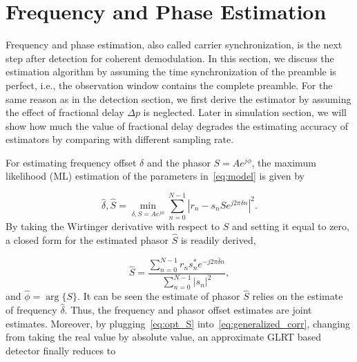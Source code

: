 \section{Frequency and Phase Estimation}%
\label{sec:freq_est}

Frequency and phase estimation, also called carrier synchronization, is the next step after detection for coherent demodulation.
In this section, we discuss the estimation algorithm by assuming the time synchronization of the preamble is perfect, i.e., 
the observation window contains the complete preamble. For the same reason as in the detection section, we first derive the estimator
by assuming the effect of fractional delay $\Delta p$ is neglected.
Later in simulation section, we will show how much the value of fractional delay degrades the estimating accuracy of estimators by
comparing with different sampling rate.

For estimating frequency offset $\delta$ and the phasor $S=Ae^{j\phi}$, the maximum likelihood (ML) estimation of the parameters in~\eqref{eq:model} is given by

\begin{equation}
\label{eq:ML_f_S}
  \hat{\delta},\hat{S}=\min_{\delta,S=Ae^{j\phi}}\sum_{n=0}^{N-1}|r_n-s_nSe^{j2\pi\delta n}|^{2}.
\end{equation}
By taking the Wirtinger derivative with respect to $S$ and setting it equal to zero, a 
closed form for the estimated phasor $\hat{S}$ is readily derived,

\begin{equation}
    \label{eq:opt_S}
    \hat{S}=\frac{\sum_{n=0}^{N-1}{r_{n}s_n^{*}e^{-j2\pi\hat{\delta} n}}}{\sum_{n=0}^{N-1}|s_{n}|^2},
  \end{equation}
and $\hat{\phi}=\arg\{S\}$. It can be seen the estimate of phasor $\hat{S}$ relies on the estimate of frequency $\hat{\delta}$.
Thus, the frequency and phasor offset estimates are
joint estimates. Moreover, by plugging~\eqref{eq:opt_S} into~\eqref{eq:generalized_corr}, 
changing from taking the real value by absolute value, an approximate GLRT based detector finally reduces to

